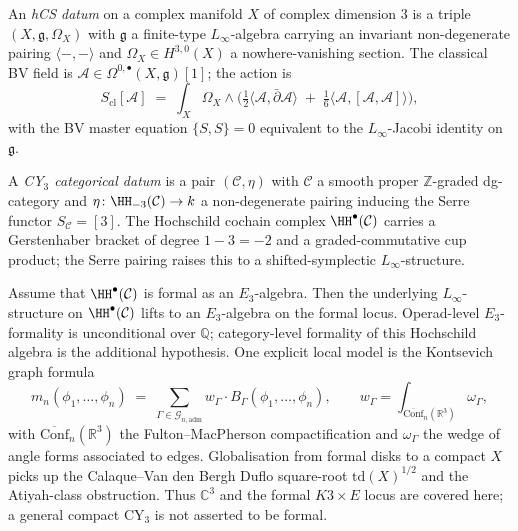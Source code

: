 \begin{definition}
\label{def:hcs-datum-treatise}
An \emph{hCS datum} on a complex manifold $X$ of complex dimension $3$ is a triple $(X, \mathfrak{g}, \Omega_X)$ with $\mathfrak{g}$ a finite-type $L_\infty$-algebra carrying an invariant non-degenerate pairing $\langle-,-\rangle$ and $\Omega_X \in H^{3,0}(X)$ a nowhere-vanishing section. The classical BV field is $\mathcal{A} \in \Omega^{0,\bullet}(X, \mathfrak{g})[1]$; the action is
\[
S_{\mathrm{cl}}[\mathcal{A}] \;=\; \int_X \Omega_X \wedge \Big( \tfrac{1}{2} \langle \mathcal{A}, \bar\partial \mathcal{A} \rangle \;+\; \tfrac{1}{6} \langle \mathcal{A}, [\mathcal{A}, \mathcal{A}] \rangle \Big),
\]
with the BV master equation $\{S, S\} = 0$ equivalent to the $L_\infty$-Jacobi identity on $\mathfrak{g}$.
\end{definition}

\begin{definition}
\label{def:cy3-cat-datum-treatise}
A \emph{CY$_3$ categorical datum} is a pair $(\mathcal{C}, \eta)$ with $\mathcal{C}$ a smooth proper $\mathbb{Z}$-graded dg-category and $\eta \colon \HH_{-3}(\mathcal{C}) \to k$ a non-degenerate pairing inducing the Serre functor $S_{\mathcal{C}} = [3]$. The Hochschild cochain complex $\HH^\bullet(\mathcal{C})$ carries a Gerstenhaber bracket of degree $1 - 3 = -2$ and a graded-commutative cup product; the Serre pairing raises this to a shifted-symplectic $L_\infty$-structure.
\end{definition}

\begin{theorem}[Formal-locus $E_3$ structure at $d = 3$]
\label{thm:kt-formality-d3-treatise}
Assume that $\HH^\bullet(\mathcal{C})$ is formal as an $E_3$-algebra.
Then the underlying $L_\infty$-structure on $\HH^\bullet(\mathcal{C})$
lifts to an $E_3$-algebra on the formal locus.  Operad-level
$E_3$-formality is unconditional over $\mathbb Q$; category-level
formality of this Hochschild algebra is the additional hypothesis.  One
explicit local model is the Kontsevich graph formula
\[
m_n(\phi_1, \ldots, \phi_n) \;=\; \sum_{\Gamma \in \mathcal{G}_{n, \mathrm{adm}}} w_\Gamma \cdot B_\Gamma(\phi_1, \ldots, \phi_n), \qquad w_\Gamma = \int_{\overline{\mathrm{Conf}}_n(\mathbb{R}^3)} \omega_\Gamma,
\]
with $\overline{\mathrm{Conf}}_n(\mathbb{R}^3)$ the
Fulton--MacPherson compactification and $\omega_\Gamma$ the wedge of
angle forms associated to edges.  Globalisation from formal disks to a
compact $X$ picks up the Calaque--Van den Bergh Duflo square-root
$\mathrm{td}(X)^{1/2}$ and the Atiyah-class obstruction.  Thus
$\mathbb{C}^3$ and the formal $K3\times E$ locus are covered here; a
general compact CY$_3$ is not asserted to be formal.
\end{theorem}

